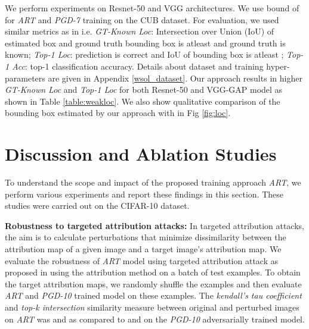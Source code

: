 \documentclass[runningheads]{llncs}
\begin{document}
We perform experiments on Resnet-50 \cite{resnet} and VGG \cite{vggpaper} architectures. We use  bound of  for \textit{ART} and \textit{PGD-7} training on the CUB dataset. For evaluation, we used similar metrics as in \cite{adl} i.e. \textit{GT-Known Loc}: Intersection over Union (IoU) of estimated box and ground truth bounding box is atleast  and ground truth is known; \textit{Top-1 Loc}: prediction is correct and IoU of bounding box is atleast ; \textit{Top-1 Acc}: top-1 classification accuracy. Details about dataset and training hyper-parameters are given in Appendix \ref{wsol_dataset}. Our approach results in higher \textit{GT-Known Loc} and \textit{Top-1 Loc} for both Resnet-50 and VGG-GAP \cite{adl} model as shown in  Table \ref{table:weakloc}. We also show qualitative comparison of the bounding box estimated by our approach with \cite{adl} in Fig \ref{fig:loc}.


\section{Discussion and Ablation Studies}
\label{sec_ablations}
To understand the scope and impact of the proposed training approach \textit{ART}, we perform various experiments and report these findings in this section. These studies were carried out on the CIFAR-10 dataset.

\noindent\textbf{Robustness to targeted attribution attacks:} In targeted attribution attacks, the aim is to calculate perturbations that minimize dissimilarity between the attribution map of a given image and a target image's attribution map. We evaluate the robustness of \textit{ART} model using targeted attribution attack as proposed in \cite{nips_sal} using the  attribution method on a batch of  test examples. To obtain the target attribution maps, we randomly shuffle the examples and then evaluate \textit{ART} and \textit{PGD-10} trained model on these examples. The \textit{kendall's tau coefficient} and \textit{top-k intersection} similarity measure between original and perturbed images on \textit{ART} was  and  as compared to  and  on the \textit{PGD-10} adversarially trained model.
\end{document}
